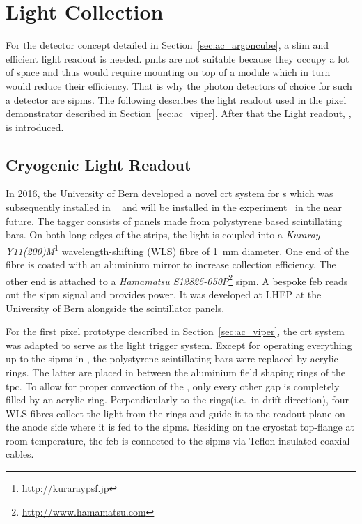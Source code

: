 \section{Light Collection}
\label{sec:studies_light-col}

For the \AC{} detector concept detailed in Section~\ref{sec:ac_argoncube}, a slim and efficient light readout is needed.
\glspl{pmt} are not suitable because they occupy a lot of space and thus would require mounting on top of a module which in turn would reduce their efficiency.
That is why the photon detectors of choice for such a detector are \glspl{sipm}.
The following describes the light readout used in the \AC{} pixel demonstrator described in Section~\ref{sec:ac_viper}.
After that the \AC{} Light readout, \AL{}, is introduced.


\subsection{Cryogenic  Light Readout}
\label{sec:studies_light-col_viper}

In 2016, the University of Bern developed a novel \gls{crt} system for \lartpc{}s which was subsequently installed in \uboone{}~\cite{uboone} and will be installed in the \sbnd{} experiment~\cite{sbnd} in the near future.
The tagger consists of panels made from polystyrene based scintillating bars.
On both long edges of the strips, the light is coupled into a \emph{Kuraray Y11(200)M}\footnote{\url{http://kuraraypsf.jp}} wavelength-shifting (WLS) fibre of \SI{1}{\milli\metre} diameter.
One end of the fibre is coated with an aluminium mirror to increase collection efficiency.
The other end is attached to a \emph{Hamamatsu S12825-050P}\footnote{\url{http://www.hamamatsu.com}} \gls{sipm}.
A bespoke \gls{feb} reads out the \gls{sipm} signal and provides power.
It was developed at LHEP at the University of Bern alongside the scintillator panels\cite{crt_feb}.

For the first pixel prototype described in Section~\ref{sec:ac_viper}, the \gls{crt} system was adapted to serve as the light trigger system.
Except for operating everything up to the \glspl{sipm} in \lar{}, the polystyrene scintillating bars were replaced by acrylic rings.
The latter are placed in between the aluminium field shaping rings of the \gls{tpc}.
To allow for proper convection of the \lar{}, only every other gap is completely filled by an acrylic ring.
Perpendicularly to the rings(i.e.\ in drift direction), four WLS fibres collect the light from the rings and guide it to the readout plane on the anode side where it is fed to the \glspl{sipm}.
Residing on the cryostat top-flange at room temperature, the \gls{feb} is connected to the \glspl{sipm} via Teflon insulated coaxial cables.

